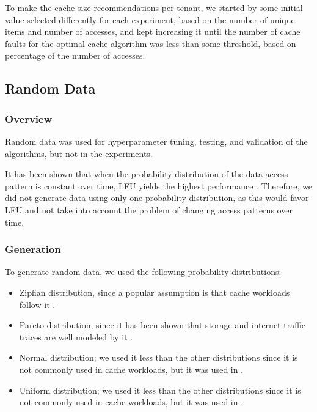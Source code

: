 To make the cache size recommendations per tenant, we started by some initial value selected differently
for each experiment, based on the number of unique items and number of accesses, and kept increasing it 
until the number of cache faults for the optimal cache algorithm was less than some threshold, based 
on percentage of the number of accesses.

\subsection{Random Data}


\subsubsection{Overview}

Random data was used for hyperparameter tuning, testing, and validation of the algorithms, 
but not in the experiments.

It has been shown that when the probability distribution of the data access pattern is constant 
over time, LFU yields the highest performance \cite{lfu-highest-perf-zipf} 
\cite{lfu-highest-perf-inproc} \cite{tiny-lfu}. Therefore, we did not generate data using only 
one probability distribution, as this would favor LFU and not take into account the problem of 
changing access patterns over time.

\subsubsection{Generation}

To generate random data, we used the following probability distributions:

\begin{itemize}
    \item Zipfian distribution, since a popular assumption is that cache workloads follow it 
    \cite{zipf-dist-cache-1} \cite{zipf-dist-cache-2} \cite{zipf-dist-cache-3} 
    \cite{lfu-highest-perf-zipf}.
    \item Pareto distribution, since it has been shown that storage and internet traffic traces 
    are well modeled by it \cite{pareto-dist-workload} \cite{pareto-dist-workload-2} 
    \cite{pareto-dist-workload-3}.
    \item Normal distribution; we used it less than the other distributions since it is not 
    commonly used in cache workloads, but it was used in \cite{memory-aware-buffer-pool-manager}.
    \item Uniform distribution; we used it less than the other distributions since it is not 
    commonly used in cache workloads, but it was used in \cite{memory-aware-buffer-pool-manager}.
\end{itemize}

